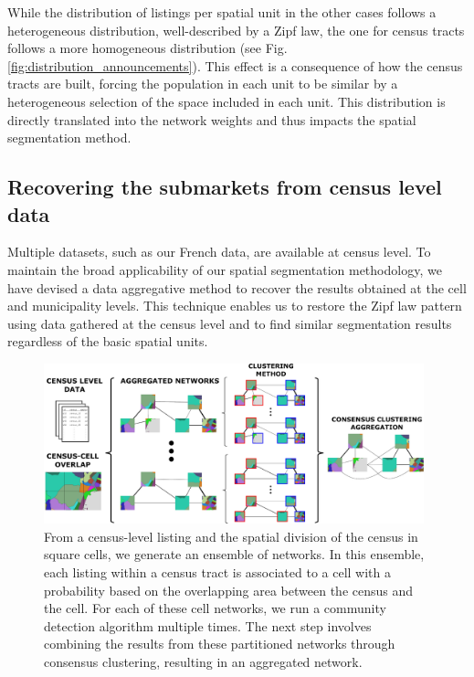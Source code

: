 While the distribution of listings per spatial unit in the other cases follows a heterogeneous distribution, well-described by a Zipf law, the one for census tracts follows a more homogeneous distribution (see Fig. \ref{fig:distribution_announcements}). This effect is a consequence of how the census tracts are built, forcing the population in each unit to be similar by a heterogeneous selection of the space included in each unit. This distribution is directly translated into the network weights and thus impacts the spatial segmentation method. 

\subsection{Recovering the submarkets from census level data}\label{sec:data_agreggation}

Multiple datasets, such as our French data, are available at census level. To maintain the broad applicability of our spatial segmentation methodology, we have devised a data aggregative method to recover the results obtained at the cell and municipality levels. This technique enables us to restore the Zipf law pattern using data gathered at the census level and to find similar segmentation results regardless of the basic spatial units.

\begin{figure}
    \centering
    \includegraphics[width = 0.98\textwidth]{Figs/Idealista_segmentation/Census_cell_method.pdf}
	\caption[Stochastic aggregative method using census level data.]{ From a census-level listing and the spatial division of the census in square cells, we generate an ensemble of networks. In this ensemble, each listing within a census tract is associated to a cell with a probability based on the overlapping area between the census and the cell. For each of these cell networks, we run a community detection algorithm multiple times. The next step involves combining the results from these partitioned networks through consensus clustering, resulting in an aggregated network. \label{fig:stochastic_construction}}
\end{figure}

